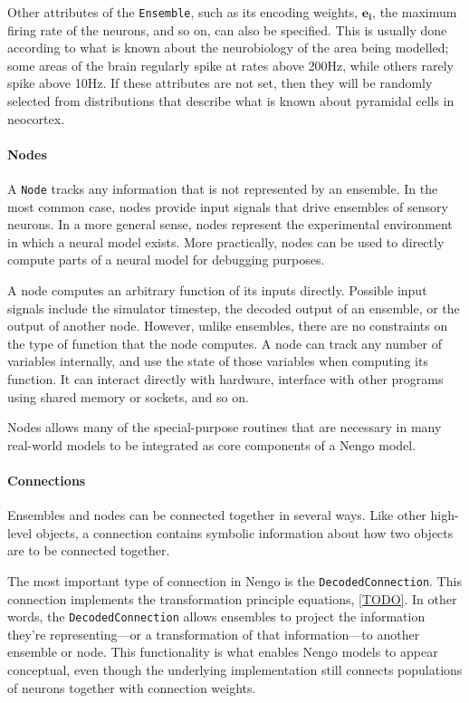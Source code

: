 \documentclass{frontiersSCNS}
\begin{document}
Other attributes of the \texttt{Ensemble},
such as its encoding weights, $\mathbf{e_i}$,
the maximum firing rate of the neurons,
and so on, can also be specified.
This is usually done according
to what is known about
the neurobiology of the area being modelled;
some areas of the brain regularly spike
at rates above 200Hz,
while others rarely spike above 10Hz.
If these attributes are not set,
then they will be randomly selected
from distributions that describe
what is known about pyramidal cells in neocortex.

\paragraph{Nodes}
A \texttt{Node} tracks any information
that is not represented by an ensemble.
In the most common case,
nodes provide input signals
that drive ensembles of sensory neurons.
In a more general sense,
nodes represent the experimental environment
in which a neural model exists.
More practically,
nodes can be used to directly compute
parts of a neural model
for debugging purposes.

A node computes an arbitrary function
of its inputs directly.
Possible input signals include
the simulator timestep,
the decoded output of an ensemble,
or the output of another node.
However, unlike ensembles,
there are no constraints on the type
of function that the node computes.
A node can track any number of variables internally,
and use the state of those variables
when computing its function.
It can interact directly with hardware,
interface with other programs
using shared memory or sockets,
and so on.

Nodes allows many of the special-purpose
routines that are necessary in many real-world
models to be integrated
as core components of a Nengo model.

\paragraph{Connections}

Ensembles and nodes can be connected together
in several ways.
Like other high-level objects,
a connection contains symbolic information
about how two objects are to be connected
together.

The most important type of connection
in Nengo is the \texttt{DecodedConnection}.
This connection implements
the transformation principle equations,
\eqref{TODO}.
In other words, the \texttt{DecodedConnection}
allows ensembles to project
the information they're representing---or
a transformation of that information---to
another ensemble or node.
This functionality is what enables Nengo models
to appear conceptual,
even though the underlying implementation
still connects populations of neurons
together with connection weights.
\end{document}
